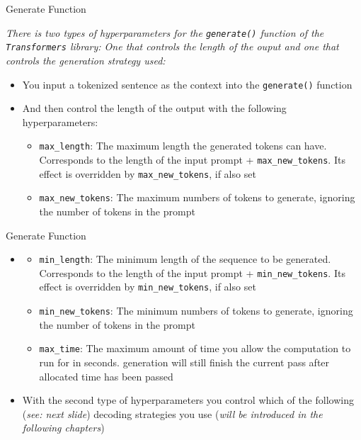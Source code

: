 \begin{frame}{Generate Function}

\textit{There is two types of hyperparameters for the \texttt{generate()} function of the \texttt{Transformers} library: One that controls the length of the ouput and one that controls the generation strategy used:} 

\begin{itemize}
    \item You input a tokenized sentence as the context into the \texttt{generate()} function
    \item And then control the length of the output with the following hyperparameters:
    \begin{itemize}
        \item \texttt{max\_length}: The maximum length the generated tokens can have. Corresponds to the length of the input prompt + \texttt{max\_new\_tokens}. Its effect is overridden by \texttt{max\_new\_tokens}, if also set
        \item \texttt{max\_new\_tokens}: The maximum numbers of tokens to generate, ignoring the number of tokens in the prompt
    \end{itemize}
\end{itemize}

\vfill

\end{frame}


\begin{frame}{Generate Function}

\begin{itemize}
    \item[] %
    \begin{itemize}
        \item \texttt{min\_length}: The minimum length of the sequence to be generated. Corresponds to the length of the input prompt + \texttt{min\_new\_tokens}. Its effect is overridden by \texttt{min\_new\_tokens}, if also set
        \item \texttt{min\_new\_tokens}: The minimum numbers of tokens to generate, ignoring the number of tokens in the prompt
        \item \texttt{max\_time}: The maximum amount of time you allow the computation to run for in seconds. generation will still finish the current pass after allocated time has been passed
    \end{itemize}
    \item With the second type of hyperparameters you control which of the following (\textit{see: next slide}) decoding strategies you use (\textit{will be introduced in the following chapters})
\end{itemize}

\vfill
    
\end{frame}

